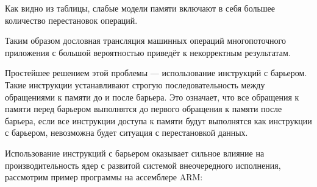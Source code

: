 \newpage

Как видно из таблицы, слабые модели памяти включают в себя большее количество перестановок операций. 

Таким образом дословная трансляция машинных операций многопоточного приложения с большой вероятностью приведёт к некорректным результатам. 

Простейшее решением этой проблемы --- использование инструкций с барьером. Такие инструкции устанавливают строгую последовательность между обращениями к памяти до и после барьера. Это означает, что все обращения к памяти перед барьером выполнятся до первого обращения к памяти после барьера, если все инструкции доступа к памяти будут выполнятся как инструкции с барьером, невозможна будет ситуация с перестановкой данных.

Использование инструкций с барьером оказывает сильное влияние на производительность ядер с развитой системой внеочередного исполнения, рассмотрим пример программы на ассемблере ARM:

